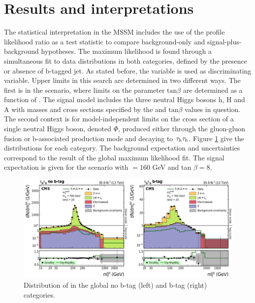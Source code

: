 \section{Results and interpretations}
\label{sec:analysis_results}

The statistical interpretation in the MSSM includes the use of the profile likelihood ratio as a test statistic to compare background-only and signal-plus-background hypotheses. The maximum likelihood is found through a simultaneous fit to data distributions in both categories, defined by the presence or absence of b-tagged jet. As stated before, the variable \mttot is used as discriminating variable. Upper limits in this search are determined in two different ways. The first is in the \mhmax scenario, where limits on the parameter  $\mathrm{tan}\beta$ are determined as a function of \ma. The signal model includes the three neutral Higgs bosons h, H and A with masses and cross sections specified by the \ma and $\mathrm{tan}\beta$ values in question. The second context is for model-independent limits on the cross section of a single neutral Higgs boson, denoted $\Phi$, produced either through the gluon-gluon fusion or b-associated production mode and decaying to $\tau_{\rm h}\tau_{\rm h}$. Figure \ref{fig:control_plots} give the \mttot distributions for each category. The background expectation and uncertainties correspond to the result of the global maximum likelihood fit. The signal expectation is given for the \mhmax scenario with \ma $= 160$ GeV and tan $\beta = 8$.

\begin{figure}
    \centering
    \includegraphics[width=\textwidth]{Images/2016MSSMmttot.png}
    \caption{Distribution of \mttot in the global no b-tag (left) and b-tag (right) categories.}
    \label{fig:control_plots}
\end{figure}

